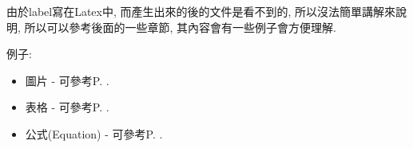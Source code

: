 由於label寫在Latex中, 而產生出來的後的文件是看不到的, 所以沒法簡單講解來說明, 所以可以參考後面的一些章節, 其內容會有一些例子會方便理解.

例子:
\begin{itemize}
  \item 圖片 - 可參考P. .

  \item 表格 - 可參考P. .

  \item 公式(Equation) - 可參考P. .
\end{itemize}

